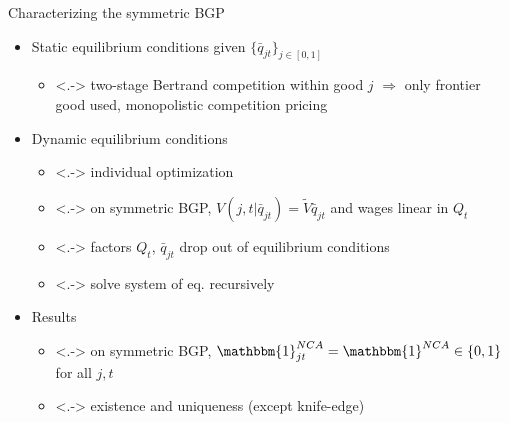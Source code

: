 \documentclass[english,usenames,dvipsnames]{beamer}
\begin{document}
\begin{frame}{Characterizing the symmetric BGP}\label{characterizing_BGP}
	\hyperlink{definition:symmetric_bgp}{}
	\begin{itemize}
		\item<+-> Static equilibrium conditions given $\{\bar{q}_{jt}\}_{j \in [0,1]}$ \hyperlink{static_eq_conditions}{}
		\begin{itemize}
			\item<.-> two-stage Bertrand competition within good $j$ $\Rightarrow$ only frontier good used, monopolistic competition pricing \hyperlink{two_stage_bertrand}{}
		\end{itemize}
		\medskip
		\item<+-> Dynamic equilibrium conditions
		\begin{itemize}
			\item<.-> individual optimization \hyperlink{HJB_incumbent}{} \hyperlink{household_optimization}{} 
			\item<.-> on symmetric BGP, $V(j,t|\bar{q}_{jt}) = \tilde{V} \bar{q}_{jt}$ and wages linear in $Q_t$  \hyperlink{proposition:hjb_scaling}{} 
			\item<.-> factors $Q_t$, $\bar{q}_{jt}$ drop out of equilibrium conditions 
			\item<.-> solve system of eq. recursively 
			\hyperlink{eq_innovation_and_growth}{} 
		\end{itemize}
		\medskip
		\item<+-> Results 
		\begin{itemize}
			\item<.-> on symmetric BGP, $\mathbbm{1}^{NCA}_{jt} = \mathbbm{1}^{NCA} \in \{0,1\}$ for all $j,t$
			\item<.-> existence and uniqueness (except knife-edge) \hyperlink{existence_and_uniqueness}{} 
		\end{itemize}
	\end{itemize}
\end{frame}
\end{document}
